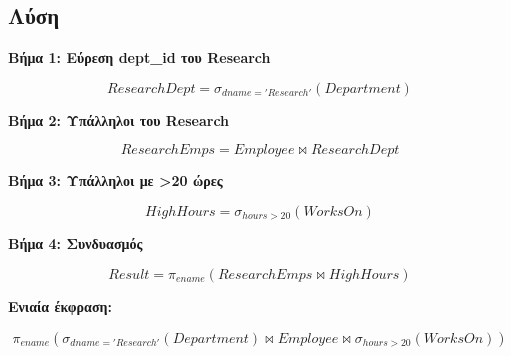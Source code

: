 \subsection*{Λύση}

\textbf{Βήμα 1: Εύρεση dept\_id του Research}

$$ResearchDept = \sigma_{dname='Research'}(Department)$$

\textbf{Βήμα 2: Υπάλληλοι του Research}

$$ResearchEmps = Employee \bowtie ResearchDept$$

\textbf{Βήμα 3: Υπάλληλοι με >20 ώρες}

$$HighHours = \sigma_{hours > 20}(WorksOn)$$

\textbf{Βήμα 4: Συνδυασμός}

$$Result = \pi_{ename}(ResearchEmps \bowtie HighHours)$$

\textbf{Ενιαία έκφραση:}

$$\pi_{ename}(\sigma_{dname='Research'}(Department) \bowtie Employee \bowtie \sigma_{hours>20}(WorksOn))$$
